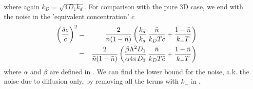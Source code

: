 where again $k_D = \sqrt{4 D_1 k_d}$. For comparison with the pure 3D case, we end with the noise in the 'equivalent concentration' $\bar{c}$
\begin{eqnarray}
  \left( \frac{\delta c}{\bar{c}} \right)^2 & = & \frac{2}{\bar{n}(1-\bar{n})} \left( \frac{k_d}{k_a} \, \frac{\bar{n}}{k_D T \bar{c}} + \frac{1-\bar{n}}{k_- T}  \right) \\
 & = & \frac{2}{\bar{n}(1-\bar{n})} \left( \frac{\beta \Lambda^2 D_1}{\alpha 4 \pi D_3} \, \frac{\bar{n}}{k_D T \bar{c}} + \frac{1-\bar{n}}{k_- T}  \right)
 \elabel{NBWMJ}
\end{eqnarray}
where $\alpha$ and $\beta$ are defined in . We can find the lower bound for the noise, a.k. the noise due to diffusion only, by removing all the terms with $k_-$ in .


